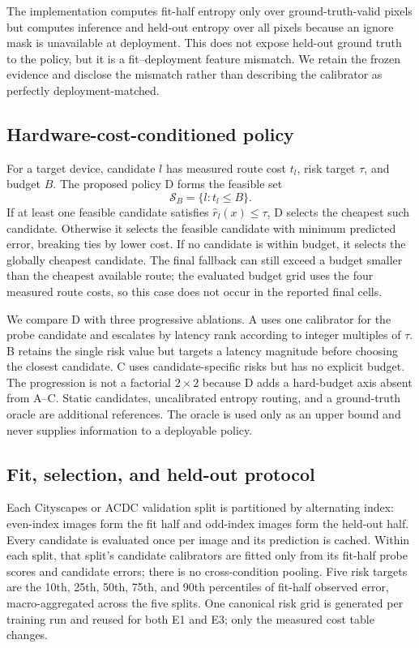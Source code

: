 \documentclass[a4paper,review,12pt]{elsarticle}
\begin{document}
The implementation computes fit-half entropy only over ground-truth-valid pixels but computes inference and held-out entropy over all pixels because an ignore mask is unavailable at deployment. This does not expose held-out ground truth to the policy, but it is a fit--deployment feature mismatch. We retain the frozen evidence and disclose the mismatch rather than describing the calibrator as perfectly deployment-matched.

\subsection{Hardware-cost-conditioned policy}
\label{sec:policy}

For a target device, candidate $l$ has measured route cost $t_l$, risk target $\tau$, and budget $B$. The proposed policy D forms the feasible set
\begin{equation}
\mathcal{S}_B=\{l:t_l\leq B\}.
\label{eq:feasible}
\end{equation}
If at least one feasible candidate satisfies $\widehat{r}_l(x)\leq\tau$, D selects the cheapest such candidate. Otherwise it selects the feasible candidate with minimum predicted error, breaking ties by lower cost. If no candidate is within budget, it selects the globally cheapest candidate. The final fallback can still exceed a budget smaller than the cheapest available route; the evaluated budget grid uses the four measured route costs, so this case does not occur in the reported final cells.

We compare D with three progressive ablations. A uses one calibrator for the probe candidate and escalates by latency rank according to integer multiples of $\tau$. B retains the single risk value but targets a latency magnitude before choosing the closest candidate. C uses candidate-specific risks but has no explicit budget. The progression is not a factorial $2\times2$ because D adds a hard-budget axis absent from A--C. Static candidates, uncalibrated entropy routing, and a ground-truth oracle are additional references. The oracle is used only as an upper bound and never supplies information to a deployable policy.

\subsection{Fit, selection, and held-out protocol}
\label{sec:split}

Each Cityscapes or ACDC validation split is partitioned by alternating index: even-index images form the fit half and odd-index images form the held-out half. Every candidate is evaluated once per image and its prediction is cached. Within each split, that split's candidate calibrators are fitted only from its fit-half probe scores and candidate errors; there is no cross-condition pooling. Five risk targets are the 10th, 25th, 50th, 75th, and 90th percentiles of fit-half observed error, macro-aggregated across the five splits. One canonical risk grid is generated per training run and reused for both E1 and E3; only the measured cost table changes.
\end{document}
